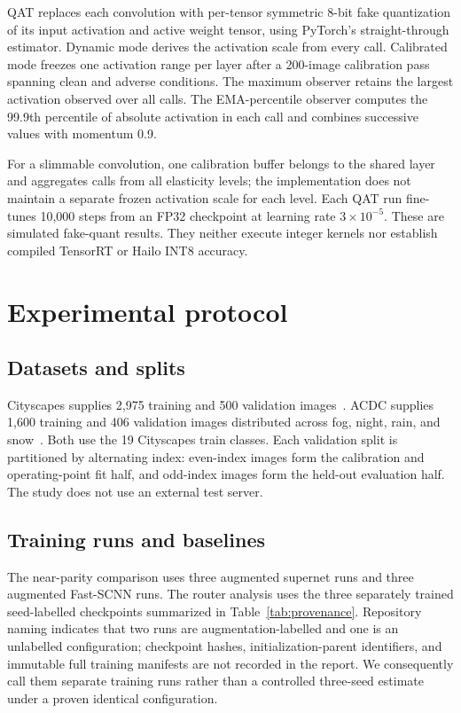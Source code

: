 \documentclass[a4paper,review,12pt]{elsarticle}
\begin{document}
QAT replaces each convolution with per-tensor symmetric 8-bit fake quantization of its input activation and active weight tensor, using PyTorch's straight-through estimator. Dynamic mode derives the activation scale from every call. Calibrated mode freezes one activation range per layer after a 200-image calibration pass spanning clean and adverse conditions. The maximum observer retains the largest activation observed over all calls. The EMA-percentile observer computes the 99.9th percentile of absolute activation in each call and combines successive values with momentum 0.9.

For a slimmable convolution, one calibration buffer belongs to the shared layer and aggregates calls from all elasticity levels; the implementation does not maintain a separate frozen activation scale for each level. Each QAT run fine-tunes 10,000 steps from an FP32 checkpoint at learning rate $3\times10^{-5}$. These are simulated fake-quant results. They neither execute integer kernels nor establish compiled TensorRT or Hailo INT8 accuracy.

\section{Experimental protocol}
\label{sec:protocol}

\subsection{Datasets and splits}

Cityscapes supplies 2,975 training and 500 validation images~\cite{cordts2016cityscapes}. ACDC supplies 1,600 training and 406 validation images distributed across fog, night, rain, and snow~\cite{sakaridis2021acdc}. Both use the 19 Cityscapes train classes. Each validation split is partitioned by alternating index: even-index images form the calibration and operating-point fit half, and odd-index images form the held-out evaluation half. The study does not use an external test server.

\subsection{Training runs and baselines}

The near-parity comparison uses three augmented supernet runs and three augmented Fast-SCNN runs. The router analysis uses the three separately trained seed-labelled checkpoints summarized in Table~\ref{tab:provenance}. Repository naming indicates that two runs are augmentation-labelled and one is an unlabelled configuration; checkpoint hashes, initialization-parent identifiers, and immutable full training manifests are not recorded in the report. We consequently call them separate training runs rather than a controlled three-seed estimate under a proven identical configuration.
\end{document}
